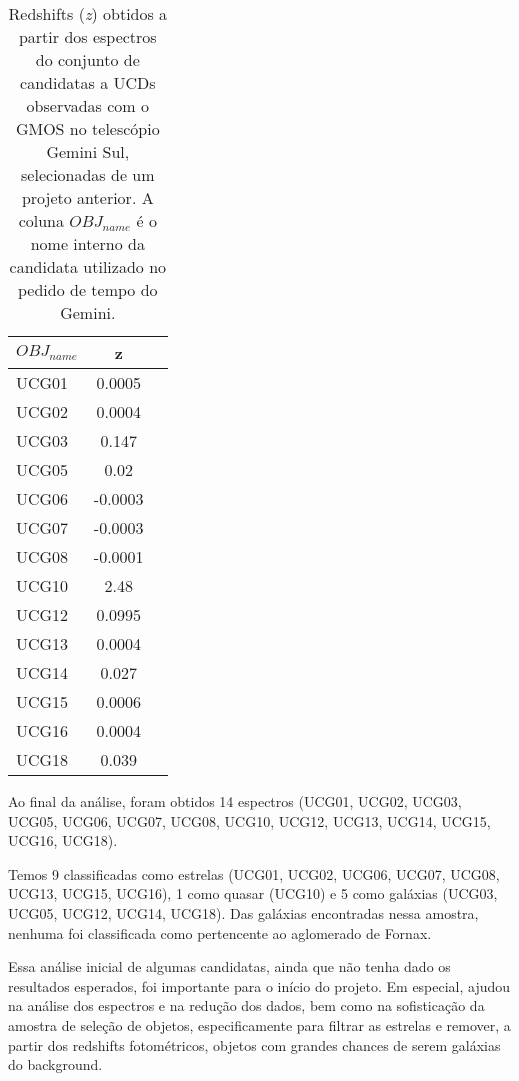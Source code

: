 \begin{table}[!ht]
    \centering
    \caption{Redshifts (\textit{z}) obtidos a partir dos espectros do conjunto de candidatas a UCDs observadas com o GMOS no telescópio Gemini Sul, selecionadas de um projeto anterior. A coluna $OBJ_{name}$ é o nome interno da candidata utilizado no pedido de tempo do Gemini.} 
    \begin{tabular}{lcc}
        \toprule
        $OBJ_{name}$ & z   \\
        \midrule
        UCG01     & 0.0005 \\
        UCG02     & 0.0004 \\
        UCG03     & 0.147 \\
        UCG05     & 0.02 \\
        UCG06     & -0.0003 \\
        UCG07     & -0.0003 \\
        UCG08     & -0.0001 \\
        UCG10     & 2.48 \\
        UCG12     & 0.0995 \\
        UCG13     & 0.0004 \\
        UCG14     & 0.027 \\
        UCG15     & 0.0006 \\
        UCG16     & 0.0004 \\
        UCG18     & 0.039 \\
        \bottomrule
    \end{tabular}
    \label{redshift_candidatas_1}
\end{table}


Ao final da análise, foram obtidos 14 espectros (UCG01, UCG02, UCG03, UCG05, UCG06, UCG07, UCG08, UCG10, UCG12, UCG13, UCG14, UCG15, UCG16, UCG18).

Temos 9 classificadas como estrelas (UCG01, UCG02, UCG06, UCG07, UCG08, UCG13, UCG15, UCG16), 1 como quasar (UCG10) e 5 como galáxias (UCG03, UCG05, UCG12, UCG14, UCG18). Das galáxias encontradas nessa amostra, nenhuma foi classificada como pertencente ao aglomerado de Fornax.

Essa análise inicial de algumas candidatas, ainda que não tenha dado os resultados esperados, foi importante para o início do projeto. Em especial, ajudou na análise dos espectros e na redução dos dados, bem como na sofisticação da amostra de seleção de objetos, especificamente para filtrar as estrelas e remover, a partir dos redshifts fotométricos, objetos com grandes chances de serem galáxias do background.

